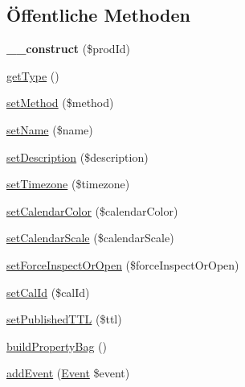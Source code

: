 \subsection*{Öffentliche Methoden}
\begin{DoxyCompactItemize}
\item 
\mbox{\label{class_eluceo_1_1i_cal_1_1_component_1_1_calendar_a8d7eec047840f53c1ce6de22f9f7045a}} 
{\bfseries \+\_\+\+\_\+construct} (\$prod\+Id)
\item 
\mbox{\hyperlink{class_eluceo_1_1i_cal_1_1_component_1_1_calendar_a37cb0ba6b7ffa6b84ca9c06a8be7d882}{get\+Type}} ()
\item 
\mbox{\hyperlink{class_eluceo_1_1i_cal_1_1_component_1_1_calendar_a39023ed69e30af7b94799e7677197d16}{set\+Method}} (\$method)
\item 
\mbox{\hyperlink{class_eluceo_1_1i_cal_1_1_component_1_1_calendar_adf80b9aa9dc6481fe45b78142ae1aec2}{set\+Name}} (\$name)
\item 
\mbox{\hyperlink{class_eluceo_1_1i_cal_1_1_component_1_1_calendar_aedd67c51c2fe1386f132bfb45148cb59}{set\+Description}} (\$description)
\item 
\mbox{\hyperlink{class_eluceo_1_1i_cal_1_1_component_1_1_calendar_a4f3e601c0ef99350dc2b4d454fb126c9}{set\+Timezone}} (\$timezone)
\item 
\mbox{\hyperlink{class_eluceo_1_1i_cal_1_1_component_1_1_calendar_ac77495dbc6d258d3a385026f267966c3}{set\+Calendar\+Color}} (\$calendar\+Color)
\item 
\mbox{\hyperlink{class_eluceo_1_1i_cal_1_1_component_1_1_calendar_a869f95eff68194dc77eb549b17516feb}{set\+Calendar\+Scale}} (\$calendar\+Scale)
\item 
\mbox{\hyperlink{class_eluceo_1_1i_cal_1_1_component_1_1_calendar_a623d0cda85b6b5eda9600aa035b6388f}{set\+Force\+Inspect\+Or\+Open}} (\$force\+Inspect\+Or\+Open)
\item 
\mbox{\hyperlink{class_eluceo_1_1i_cal_1_1_component_1_1_calendar_a17acdac642afaf8e87e305fa44621564}{set\+Cal\+Id}} (\$cal\+Id)
\item 
\mbox{\hyperlink{class_eluceo_1_1i_cal_1_1_component_1_1_calendar_afc9e8e19e33559fed2c32ff4e2fedab8}{set\+Published\+T\+TL}} (\$ttl)
\item 
\mbox{\hyperlink{class_eluceo_1_1i_cal_1_1_component_1_1_calendar_ac38327d32ec22f39e2d556ded32731c9}{build\+Property\+Bag}} ()
\item 
\mbox{\hyperlink{class_eluceo_1_1i_cal_1_1_component_1_1_calendar_a1f0cf8d3ca1bfee4d03b352d2f6d1698}{add\+Event}} (\mbox{\hyperlink{class_eluceo_1_1i_cal_1_1_component_1_1_event}{Event}} \$event)

\end{DoxyCompactItemize}
